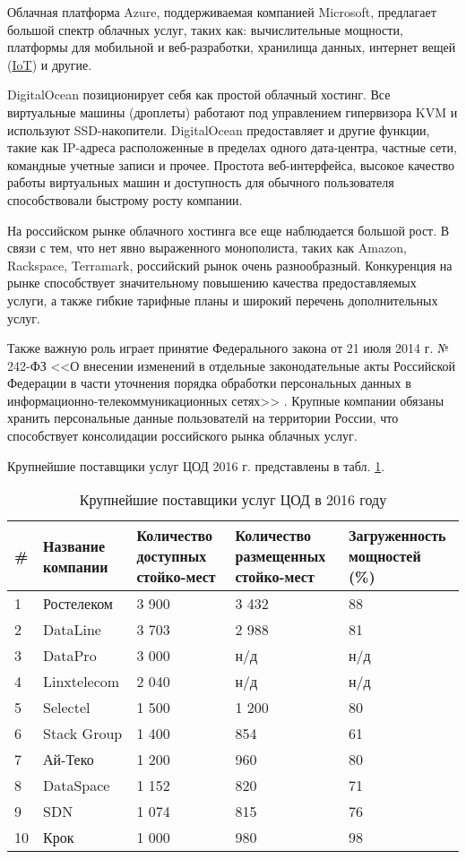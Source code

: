 Облачная платформа Azure, поддерживаемая компанией Microsoft, предлагает большой спектр облачных услуг, таких как: вычислительные мощности, платформы для мобильной и веб-разработки, хранилища данных, интернет вещей (\hyperlink{iot}{IoT}) и другие.

DigitalOcean позиционирует себя как простой облачный хостинг.
Все виртуальные машины (дроплеты) работают под управлением гипервизора KVM и используют SSD-накопители.
DigitalOcean предоставляет и другие функции, такие как IP-адреса расположенные в пределах одного дата-центра, частные сети, командные учетные записи и прочее.
Простота веб-интерфейса, высокое качество работы виртуальных машин и доступность для обычного пользователя способствовали быстрому росту компании.

На российском рынке облачного хостинга все еще наблюдается большой рост.
В связи с тем, что нет явно выраженного монополиста, таких как Amazon, Rackspace, Terramark, российский рынок очень разнообразный.
Конкуренция на рынке способствует значительному повышению качества предоставляемых услуги, а также гибкие тарифные планы и широкий перечень дополнительных услуг.

Также важную роль играет принятие Федерального закона от 21 июля 2014 г. № 242-ФЗ <<О внесении изменений в отдельные законодательные акты Российской Федерации в части уточнения порядка обработки персональных данных в информационно-телекоммуникационных сетях>> \cite{minsvyaz}.
Крупные компании обязаны хранить персональные данные пользователй на территории России, что способствует консолидации российского рынка облачных услуг.

Крупнейшие поставщики услуг ЦОД 2016 г. \cite{cnews} представлены в табл. \ref{dc-table}.
\begin{table}[H]
  \caption{Крупнейшие поставщики услуг ЦОД в 2016 году}\label{dc-table}
  \begin{tabular}{|p{0.6cm}|p{2.6cm}|p{3cm}|p{3.5cm}|p{3.5cm}|}
  \hline \# & Название компании & Количество доступных стойко-мест & Количество размещенных стойко-мест & Загруженность мощностей (\%) \\
  \hline 1 & Ростелеком & 3 900 & 3 432 & 88 \\
  \hline 2 & DataLine & 3 703 & 2 988 & 81 \\
  \hline 3 & DataPro & 3 000 & н/д & н/д \\
  \hline 4 & Linxtelecom & 2 040 & н/д & н/д \\
  \hline 5 & Selectel & 1 500 & 1 200 & 80 \\
  \hline 6 & Stack Group & 1 400 & 854 & 61 \\
  \hline 7 & Ай-Теко & 1 200 & 960 & 80 \\
  \hline 8 & DataSpace & 1 152 & 820 & 71 \\
  \hline 9 & SDN & 1 074 & 815 & 76 \\
  \hline 10 & Крок & 1 000 & 980 & 98 \\
  \hline
  \end{tabular}
\end{table}

